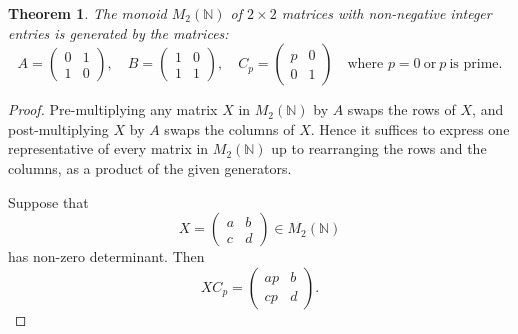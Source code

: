 \documentclass{amsart}
\newcommand{\N}{\mathbb{N}}
\numberwithin{equation}{section}
\newtheorem{thm}[equation]{Theorem}
\theoremstyle{definition}
\begin{document}
\begin{thm}
  The monoid $M_2(\N)$ of $2\times 2$ matrices with non-negative integer
  entries is generated by the matrices:
  \begin{equation*}
    A = 
    \begin{pmatrix}
      0 & 1 \\ 
      1 & 0
    \end{pmatrix},
    \quad
    B = 
    \begin{pmatrix}
      1 & 0 \\ 
      1 & 1
    \end{pmatrix}, 
    \quad
    C_p = 
    \begin{pmatrix}
      p & 0 \\ 
      0 & 1
    \end{pmatrix} \quad\text{where } p = 0\ \text{or}\ p\ \text{is prime}.
  \end{equation*}
\end{thm}
\begin{proof}
  Pre-multiplying any matrix $X$ in $M_2(\N)$ by $A$ swaps the rows of $X$, and
  post-multiplying $X$ by $A$ swaps the columns of $X$.  Hence it suffices to
  express one representative of every matrix in $M_2(\N)$ up to rearranging the
  rows and the columns, as a product of the given generators. 

  Suppose that 
  \begin{equation*}
    X = 
    \begin{pmatrix}
      a & b \\ 
      c & d
    \end{pmatrix}\in M_2(\N)
  \end{equation*}
  has non-zero determinant.
  Then 
  \begin{equation*}
    X C_p
    = 
    \begin{pmatrix}
      ap & b \\ 
      cp & d
    \end{pmatrix}.
  \end{equation*}
%  

\end{proof}

{}

\end{document}
